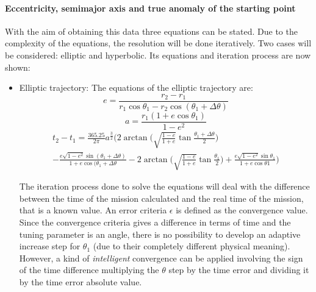\paragraph{Eccentricity, semimajor axis and true anomaly of the starting point}
With the aim of obtaining this data three equations can be stated. Due to the complexity of the equations, the resolution will be done iteratively. Two cases will be considered: elliptic and hyperbolic. Its equations and iteration process are now shown: 
\begin{itemize}
\item Elliptic trajectory:
The equations of the elliptic trajectory are: 
\begin{equation}
e=\frac{r_2-r_1}{r_1\cos\theta _1-r_2\cos(\theta_1+\Delta\theta)}
\end{equation}
\begin{equation}
a=\frac{r_1\left(1+e\cos\theta _1\right)}{1-e^2}
\end{equation}
\begin{multline}
t_2-t_1=\frac{365.25}{2\pi}a^\frac{3}{2}\Bigg(2\arctan\bigg(\sqrt{\frac{1-e}{1+e}}\tan\frac{\theta _1 +\Delta\theta}{2}\bigg)\\-\frac{e\sqrt{1-e^2}\sin (\theta _1+\Delta\theta)}{1+e\cos (\theta _1+\Delta\theta}-2\arctan\bigg(\sqrt{\frac{1-e}{1+e}}\tan \frac{\theta _1}{2}\bigg)+\frac{e\sqrt{1-e^2}\sin \theta _1}{1+e\cos \theta1}\Bigg)
\end{multline}

The iteration process done to solve the equations will deal with the difference between the time of the mission calculated and the real time of the mission, that is a known value. An error criteria $\epsilon$ is defined as the convergence value. Since the convergence criteria gives a difference in terms of time and the tuning parameter is an angle, there is no possibility to develop an adaptive increase step for $\theta_1$ (due to their completely different physical meaning). However, a kind of \textit{intelligent} convergence can be applied involving the sign of the time difference multiplying the $\theta$ step by the time error and dividing it by the time error absolute value.


\end{itemize}
